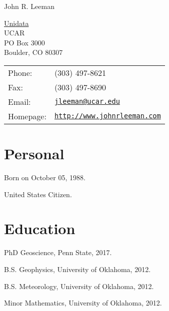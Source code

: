 \documentclass[letterpaper]{article}
\def\name{John R. Leeman}
\renewenvironment{itemize}{
  \begin{list}{}{
    \setlength{\leftmargin}{1.5em}
  }
}{
  \end{list}
}
\begin{document}
{\huge \name}


\vspace{0.25in}

\begin{minipage}{0.45\linewidth}
  \href{http://www.geosc.psu.edu/}{Unidata } \\
  UCAR \\
  PO Box 3000 \\
   Boulder, CO  80307
\end{minipage}
\begin{minipage}{0.45\linewidth}
  \begin{tabular}{ll}
    Phone: & (303) 497-8621 \\
    Fax: &  (303) 497-8690 \\
    Email: & \href{mailto:jleeman@ucar.edu}{\tt jleeman@ucar.edu} \\
    Homepage: & \href{http://www.johnrleeman.com}{\tt http://www.johnrleeman.com} \\
  \end{tabular}
\end{minipage}


\section*{Personal}

\begin{itemize}
\item Born on October 05, 1988.
\item United States Citizen.
\end{itemize}


\section*{Education}

\begin{itemize}
 \item PhD Geoscience, Penn State, 2017.

 \item B.S. Geophysics, University of Oklahoma, 2012.

  \item B.S. Meteorology, University of Oklahoma, 2012.

 \item Minor Mathematics, University of Oklahoma, 2012.
\end{itemize}
\end{document}
